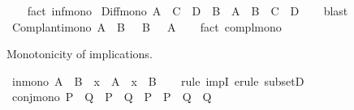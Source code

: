 \begin{isabellebody}
%
\isadelimproof
\ \ %
\endisadelimproof
%
\isatagproof
{}\isamarkupfalse%
\ {\isacharparenleft}{\kern0pt}fact\ inf{\isacharunderscore}{\kern0pt}mono{\isacharparenright}{\kern0pt}%
\endisatagproof
{\isafoldproof}%
%
\isadelimproof
\isanewline
%
\endisadelimproof
\isanewline
{}\isamarkupfalse%
\ Diff{\isacharunderscore}{\kern0pt}mono{\isacharcolon}{\kern0pt}\ {\isachardoublequoteopen}A\ {\isasymsubseteq}\ C\ {\isasymLongrightarrow}\ D\ {\isasymsubseteq}\ B\ {\isasymLongrightarrow}\ A\ {\isacharminus}{\kern0pt}\ B\ {\isasymsubseteq}\ C\ {\isacharminus}{\kern0pt}\ D{\isachardoublequoteclose}\isanewline
%
\isadelimproof
\ \ %
\endisadelimproof
%
\isatagproof
{}\isamarkupfalse%
\ blast%
\endisatagproof
{\isafoldproof}%
%
\isadelimproof
\isanewline
%
\endisadelimproof
\isanewline
{}\isamarkupfalse%
\ Compl{\isacharunderscore}{\kern0pt}anti{\isacharunderscore}{\kern0pt}mono{\isacharcolon}{\kern0pt}\ {\isachardoublequoteopen}A\ {\isasymsubseteq}\ B\ {\isasymLongrightarrow}\ {\isacharminus}{\kern0pt}\ B\ {\isasymsubseteq}\ {\isacharminus}{\kern0pt}\ A{\isachardoublequoteclose}\isanewline
%
\isadelimproof
\ \ %
\endisadelimproof
%
\isatagproof
{}\isamarkupfalse%
\ {\isacharparenleft}{\kern0pt}fact\ compl{\isacharunderscore}{\kern0pt}mono{\isacharparenright}{\kern0pt}%
\endisatagproof
{\isafoldproof}%
%
\isadelimproof
%
\endisadelimproof
%
\begin{isamarkuptext}%
\medskip Monotonicity of implications.%
\end{isamarkuptext}\isamarkuptrue%
\isamarkupfalse%
\ in{\isacharunderscore}{\kern0pt}mono{\isacharcolon}{\kern0pt}\ {\isachardoublequoteopen}A\ {\isasymsubseteq}\ B\ {\isasymLongrightarrow}\ x\ {\isasymin}\ A\ {\isasymlongrightarrow}\ x\ {\isasymin}\ B{\isachardoublequoteclose}\isanewline
%
\isadelimproof
\ \ %
\endisadelimproof
%
\isatagproof
{}\isamarkupfalse%
\ {\isacharparenleft}{\kern0pt}rule\ impI{\isacharparenright}{\kern0pt}\ {\isacharparenleft}{\kern0pt}erule\ subsetD{\isacharparenright}{\kern0pt}%
\endisatagproof
{\isafoldproof}%
%
\isadelimproof
\isanewline
%
\endisadelimproof
\isanewline
{}\isamarkupfalse%
\ conj{\isacharunderscore}{\kern0pt}mono{\isacharcolon}{\kern0pt}\ {\isachardoublequoteopen}P{}\ {\isasymlongrightarrow}\ Q{}\ {\isasymLongrightarrow}\ P{}\ {\isasymlongrightarrow}\ Q{}\ {\isasymLongrightarrow}\ {\isacharparenleft}{\kern0pt}P{}\ {\isasymand}\ P{}{\isacharparenright}{\kern0pt}\ {\isasymlongrightarrow}\ {\isacharparenleft}{\kern0pt}Q{}\ {\isasymand}\ Q{}{\isacharparenright}{\kern0pt}{\isachardoublequoteclose}\isanewline

\end{isabellebody}
